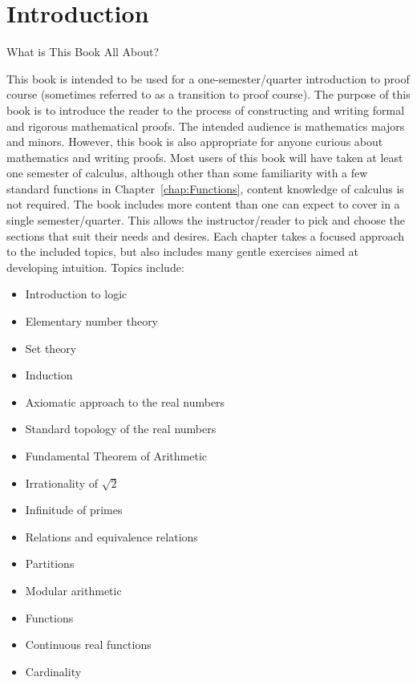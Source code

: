 \chapter{Introduction}\label{chap:intro}


\begin{section}{What is This Book All About?}%

This book is intended to be used for a one-semester/quarter introduction to proof course (sometimes referred to as a transition to proof course). The purpose of this book is to introduce the reader to the process of constructing and writing formal and rigorous mathematical proofs. The intended audience is mathematics majors and minors. However, this book is also appropriate for anyone curious about mathematics and writing proofs. Most users of this book will have taken at least one semester of calculus, although other than some familiarity with a few standard functions in Chapter~\ref{chap:Functions}, content knowledge of calculus is not required. The book includes more content than one can expect to cover in a single semester/quarter. This allows the instructor/reader to pick and choose the sections that suit their needs and desires. Each chapter takes a focused approach to the included topics, but also includes many gentle exercises aimed at developing intuition.  Topics include:
\begin{itemize}
\item Introduction to logic
\item Elementary number theory
\item Set theory
\item Induction
\item Axiomatic approach to the real numbers
\item Standard topology of the real numbers
\item Fundamental Theorem of Arithmetic
\item Irrationality of $\sqrt{2}$
\item Infinitude of primes
\item Relations and equivalence relations
\item Partitions
\item Modular arithmetic
\item Functions
\item Continuous real functions
\item Cardinality
\end{itemize}


\end{section}
